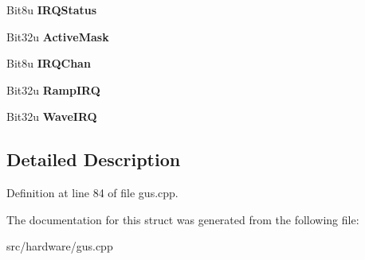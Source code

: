 \begin{DoxyCompactItemize}
\item 
\hypertarget{structGFGus_af238c9e873d19d61f046063d83f111d1}{Bit8u {\bfseries I\-R\-Q\-Status}}\label{structGFGus_af238c9e873d19d61f046063d83f111d1}

\item 
\hypertarget{structGFGus_a2d78af798c38826042b4c8ef23ebe32f}{Bit32u {\bfseries Active\-Mask}}\label{structGFGus_a2d78af798c38826042b4c8ef23ebe32f}

\item 
\hypertarget{structGFGus_a4dcb3649a667a97aede4f09ded0ace2a}{Bit8u {\bfseries I\-R\-Q\-Chan}}\label{structGFGus_a4dcb3649a667a97aede4f09ded0ace2a}

\item 
\hypertarget{structGFGus_a6020128163cdd56bbb231a5c07630e24}{Bit32u {\bfseries Ramp\-I\-R\-Q}}\label{structGFGus_a6020128163cdd56bbb231a5c07630e24}

\item 
\hypertarget{structGFGus_aa5d5f4fadf04254e2d7d4c1e5b3ccffc}{Bit32u {\bfseries Wave\-I\-R\-Q}}\label{structGFGus_aa5d5f4fadf04254e2d7d4c1e5b3ccffc}

\end{DoxyCompactItemize}


\subsection{Detailed Description}


Definition at line 84 of file gus.\-cpp.



The documentation for this struct was generated from the following file\-:\begin{DoxyCompactItemize}
\item 
src/hardware/gus.\-cpp\end{DoxyCompactItemize}
